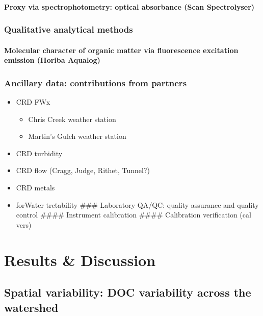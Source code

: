 \documentclass[]{article}
\providecommand{\tightlist}{%
  \setlength{\itemsep}{0pt}\setlength{\parskip}{0pt}}
\let\oldparagraph\paragraph
\renewcommand{\paragraph}[1]{\oldparagraph{#1}\mbox{}}
\begin{document}
\paragraph{Proxy via spectrophotometry: optical absorbance (Scan
Spectrolyser)}\label{proxy-via-spectrophotometry-optical-absorbance-scan-spectrolyser}

\subsubsection{Qualitative analytical
methods}\label{qualitative-analytical-methods}

\paragraph{Molecular character of organic matter via fluorescence
excitation emission (Horiba
Aqualog)}\label{molecular-character-of-organic-matter-via-fluorescence-excitation-emission-horiba-aqualog}

\subsubsection{Ancillary data: contributions from
partners}\label{ancillary-data-contributions-from-partners}

\begin{itemize}
\tightlist
\item
  CRD FWx

  \begin{itemize}
  \tightlist
  \item
    Chris Creek weather station
  \item
    Martin's Gulch weather station
  \end{itemize}
\item
  CRD turbidity
\item
  CRD flow (Cragg, Judge, Rithet, Tunnel?)
\item
  CRD metals
\item
  forWater tretability \#\#\# Laboratory QA/QC: quality assurance and
  quality control \#\#\#\# Instrument calibration \#\#\#\# Calibration
  verification (cal vers)
\end{itemize}

\section{Results \& Discussion}\label{results-discussion}

\subsection{Spatial variability: DOC variability across the
watershed}\label{spatial-variability-doc-variability-across-the-watershed}
\end{document}
